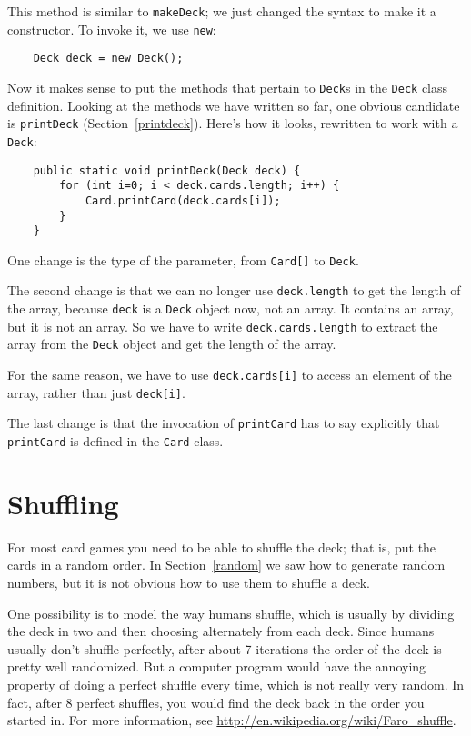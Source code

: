 \documentclass[12pt]{book}
\theoremstyle{definition}
\begin{document}
This method is similar to {\tt makeDeck};
we just changed the syntax to make it a constructor.
To invoke it, we use {\tt new}:


\begin{lstlisting}
    Deck deck = new Deck();
\end{lstlisting}
%
Now it makes sense to put
the methods that pertain to {\tt Deck}s in the {\tt Deck}
class definition.  Looking at the methods we have written so
far, one obvious candidate is {\tt printDeck} (Section~\ref{printdeck}).
Here's how it looks, rewritten to work with a {\tt Deck}:

\begin{lstlisting}
    public static void printDeck(Deck deck) {
        for (int i=0; i < deck.cards.length; i++) {
            Card.printCard(deck.cards[i]);
        }
    }
\end{lstlisting}
%
One change is the type of the parameter,
from {\tt Card[]} to {\tt Deck}.

The second change is that we can no
longer use {\tt deck.length} to get the length of the array, because
{\tt deck} is a {\tt Deck} object now, not an array.  It contains an
array, but it is not an array.  So we have to write
{\tt deck.cards.length} to extract the array from the {\tt Deck}
object and get the length of the array.

For the same reason, we have to use {\tt deck.cards[i]} to access an
element of the array, rather than just {\tt deck[i]}.

The last change
is that the invocation of {\tt printCard} has to say explicitly that
{\tt printCard} is defined in the {\tt Card} class.


\section{Shuffling}
\label{shuffle}

For most card games you need to be able to shuffle the deck;
that is, put the cards in a random order.  In Section~\ref{random}
we saw how to generate random numbers, but it is not obvious how
to use them to shuffle a deck.

One possibility is to model the way humans shuffle, which is usually
by dividing the deck in two and then choosing
alternately from each deck.  Since humans usually don't shuffle
perfectly, after about 7 iterations the order of the deck is pretty
well randomized.  But a computer program would have the annoying
property of doing a perfect shuffle every time, which is not really
very random.  In fact, after 8 perfect shuffles, you would find the
deck back in the order you started in.  For more information, see
\url{http://en.wikipedia.org/wiki/Faro_shuffle}.
\end{document}
